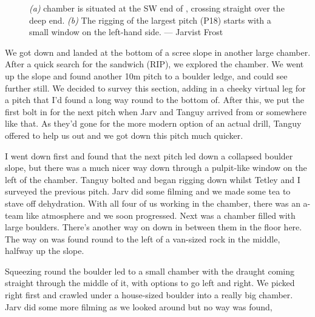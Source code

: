 \begin{figure*}[t!]
	\checkoddpage \ifoddpage \forcerectofloat \else \forceversofloat \fi
	\centering
	\begin{subfigure}[t]{0.6337\textwidth}
		\centering
		 \caption{}\label{hammerhead passage}
	\end{subfigure}
  	 \hfill
   	 \begin{subfigure}[t]{0.3563\textwidth}
        		\centering
        		\caption{} \label{hammerhead pitch}
        \end{subfigure}
	\caption{
	 	  \textit{(a)} \protect{} chamber is situated at the SW end of \protect{}, crossing straight over the deep end.  
   		 \textit{(b)} The rigging of the largest \protect{} pitch (P18) starts with a small window on the left-hand side. --- Jarvist Frost}
\end{figure*}

We got down and landed at the bottom of a scree slope in another large chamber. After a quick search for the sandwich (RIP), we explored the chamber. We went up the slope and found another 10m pitch to a boulder ledge, and could see further still.  We decided to survey this section, adding in a cheeky virtual leg for a pitch that I’d found a long way round to the bottom of. After this, we put the first bolt in for the next pitch when Jarv and Tanguy arrived from  or somewhere like that. As they’d gone for the more modern option of an actual drill, Tanguy offered to help us out and we got down this pitch much quicker. 

I went down first and found that the next pitch led down a collapsed boulder slope, but there was a much nicer way down through a pulpit-like window on the left of the chamber. Tanguy bolted and began rigging down whilst Tetley and I surveyed the previous pitch. Jarv did some filming and we made some tea to stave off dehydration. With all four of us working in the chamber, there was an a-team like atmosphere and we soon progressed. Next was a chamber filled with large boulders. There’s another way on down in between them in the floor here. The way on was found round to the left of a van-sized rock in the middle, halfway up the slope.

Squeezing round the boulder led to a small chamber with the draught coming straight through the middle of it, with options to go left and right. We picked right first and crawled under a house-sized boulder into a really big chamber. Jarv did some more filming as we looked around but no way was found,  

